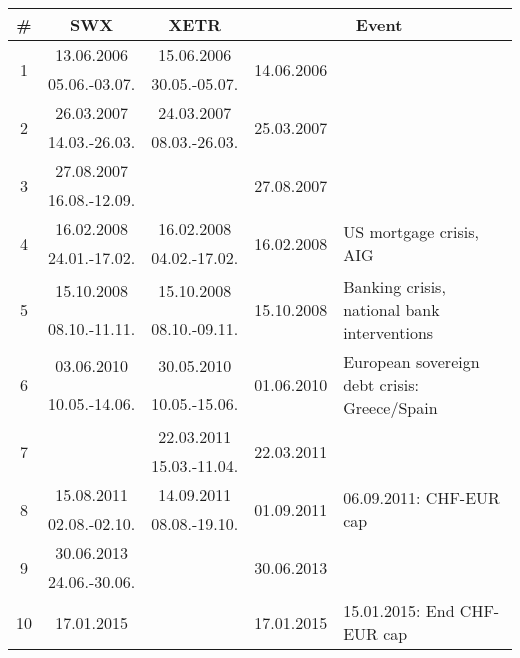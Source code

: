 \documentclass[11pt,twoside,a4paper]{article}
\numberwithin{equation}{section}
\begin{document}
\begin{table}[!ht]
\begin{tabular}{c|c|c|c|l}
\# & SWX & XETR & \multicolumn{2}{|c}{Event}\\
\hline
\multirow{2}{*}{1} & 13.06.2006 		& 15.06.2006     & \multirow{2}{*}{14.06.2006} & \multirow{2}{0.33\linewidth}{}\\
							 & 05.06.-03.07.	& 30.05.-05.07. & &\\
\hline
\multirow{2}{*}{2} & 26.03.2007 		& 24.03.2007     & \multirow{2}{*}{25.03.2007} & \multirow{2}{0.33\linewidth}{}\\
							 & 14.03.-26.03.	& 08.03.-26.03. & &\\
\hline
\multirow{2}{*}{3} & 27.08.2007 		&      & \multirow{2}{*}{27.08.2007} & \multirow{2}{0.33\linewidth}{}\\
							 & 16.08.-12.09.	& & &\\
\hline
\multirow{2}{*}{4} & 16.02.2008 		& 16.02.2008     & \multirow{2}{*}{16.02.2008} & \multirow{2}{0.33\linewidth}{US mortgage crisis, AIG}\\
							 & 24.01.-17.02.	& 04.02.-17.02. & &\\
\hline
\multirow{2}{*}{5} & 15.10.2008 		& 15.10.2008     & \multirow{2}{*}{15.10.2008} & \multirow{2}{0.33\linewidth}{Banking crisis, national bank interventions}\\
							 & 08.10.-11.11.	& 08.10.-09.11. & &\\
\hline
\multirow{2}{*}{6} & 03.06.2010 		& 30.05.2010     & \multirow{2}{*}{01.06.2010} & \multirow{2}{0.33\linewidth}{European sovereign debt crisis: Greece/Spain}\\
							 & 10.05.-14.06.	& 10.05.-15.06. & &\\
\hline
\multirow{2}{*}{7} & & 22.03.2011     & \multirow{2}{*}{22.03.2011} & \multirow{2}{0.33\linewidth}{}\\
							 & & 15.03.-11.04. & &\\
\hline
\multirow{2}{*}{8} & 15.08.2011 		& 14.09.2011  & \multirow{2}{*}{01.09.2011} & \multirow{2}{0.33\linewidth}{06.09.2011:  CHF-EUR cap}\\
							 & 02.08.-02.10.	& 08.08.-19.10. & &\\
\hline
\multirow{2}{*}{9} & 30.06.2013 		& & \multirow{2}{*}{30.06.2013} & \multirow{2}{0.33\linewidth}{}\\
							 & 24.06.-30.06.	& & &\\
\hline
\multirow{2}{*}{10} & 17.01.2015 		& & \multirow{2}{*}{17.01.2015} & \multirow{2}{0.33\linewidth}{15.01.2015: End CHF-EUR cap}\\

\end{tabular}
\end{table}
\end{document}

